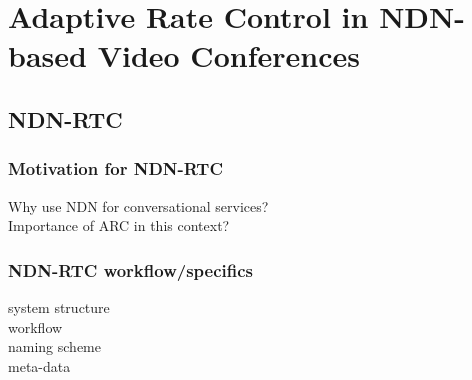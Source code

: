 \chapter{Adaptive Rate Control in NDN-based Video Conferences} \label{chapter:Topic}


\section{NDN-RTC}


\subsection{Motivation for NDN-RTC}
Why use NDN for conversational services? \\
Importance of ARC in this context?

\subsection{NDN-RTC workflow/specifics}
system structure \\
workflow \\
naming scheme \\
meta-data \\



